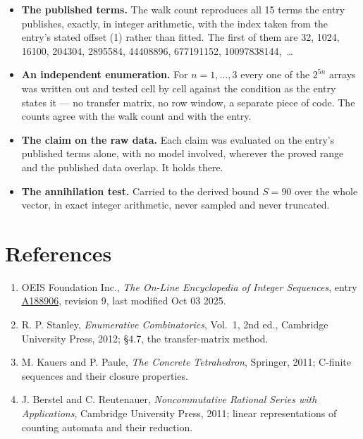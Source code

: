 \documentclass[11pt]{article}
\theoremstyle{definition}
\begin{document}
\begin{itemize}

\item {\bfseries The published terms.} The walk count reproduces all 15 terms the entry publishes, exactly, in integer arithmetic, with the index taken from the entry's stated offset (1) rather than fitted. The first of them are 32, 1024, 16100, 204304, 2895584, 44408896, 677191152, 10097838144,~\dots

\item {\bfseries An independent enumeration.} For $n = 1,\dots,3$ every one of the $2^{5n}$ arrays was written out and tested cell by cell against the condition as the entry states it --- no transfer matrix, no row window, a separate piece of code. The counts agree with the walk count and with the entry.

\item {\bfseries The claim on the raw data.} Each claim was evaluated on the entry's published terms alone, with no model involved, wherever the proved range and the published data overlap. It holds there.

\item {\bfseries The annihilation test.} Carried to the derived bound $S = 90$ over the whole vector, in exact integer arithmetic, never sampled and never truncated.

\end{itemize}

\section{References}

\begin{enumerate}

\item OEIS Foundation Inc., \emph{The On-Line Encyclopedia of Integer Sequences}, entry \href{https://oeis.org/A188906}{A188906}, revision 9, last modified Oct 03 2025.

\item R. P. Stanley, \emph{Enumerative Combinatorics}, Vol.~1, 2nd ed., Cambridge University Press, 2012; \S4.7, the transfer-matrix method.

\item M. Kauers and P. Paule, \emph{The Concrete Tetrahedron}, Springer, 2011; C-finite sequences and their closure properties.

\item J. Berstel and C. Reutenauer, \emph{Noncommutative Rational Series with Applications}, Cambridge University Press, 2011; linear representations of counting automata and their reduction.

\end{enumerate}
\end{document}
